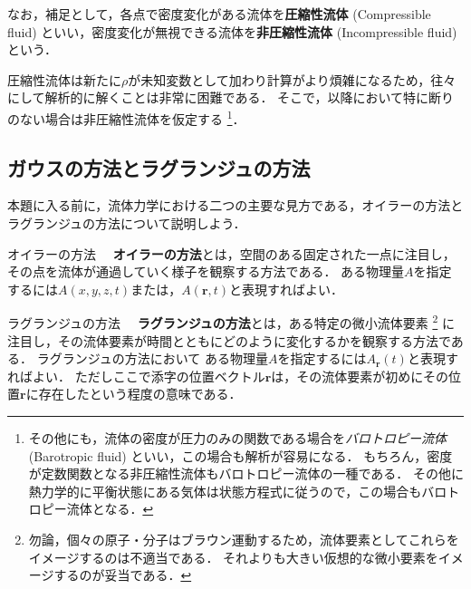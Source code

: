 \documentclass[uplatex,dvipdfmx,a4j,11pt]{jsreport}
\newcommand{\keyword}[1]{\textcolor{mainblue}{\textbf{#1}}}
\newcommand{\diff}{\mathrm{d}} %
\numberwithin{equation}{chapter}
\begin{document}
なお，補足として，各点で密度変化がある流体を\keyword{圧縮性流体} (Compressible fluid) といい，密度変化が無視できる流体を\keyword{非圧縮性流体} (Incompressible fluid) という．

圧縮性流体は新たに$\rho$が未知変数として加わり計算がより煩雑になるため，往々にして解析的に解くことは非常に困難である．
そこで，以降において特に断りのない場合は非圧縮性流体を仮定する
\footnote{
  その他にも，流体の密度が圧力のみの関数である場合を\emph{バロトロピー流体} (Barotropic fluid) といい，この場合も解析が容易になる．
  もちろん，密度が定数関数となる非圧縮性流体もバロトロピー流体の一種である．
  その他に熱力学的に平衡状態にある気体は状態方程式に従うので，この場合もバロトロピー流体となる．
}．




\subsection{ガウスの方法とラグランジュの方法}
本題に入る前に，流体力学における二つの主要な見方である，オイラーの方法とラグランジュの方法について説明しよう．

\begin{definition}{オイラーの方法}{}{}
  　\keyword{オイラーの方法}とは，空間のある固定された一点に注目し，その点を流体が通過していく様子を観察する方法である．
  ある物理量$A$を指定するには$A(x,y,z,t)$または，$A(\mathbf{r},t)$と表現すればよい．
\end{definition}

\begin{definition}{ラグランジュの方法}{}{}
  　\keyword{ラグランジュの方法}とは，ある特定の微小流体要素
  \footnote{
  勿論，個々の原子・分子はブラウン運動するため，流体要素としてこれらをイメージするのは不適当である．
  それよりも大きい仮想的な微小要素をイメージするのが妥当である．
  }
  に注目し，その流体要素が時間とともにどのように変化するかを観察する方法である．
  ラグランジュの方法において
  ある物理量$A$を指定するには$A_{\mathbf{r}}(t)$と表現すればよい．
  ただしここで添字の位置ベクトル$\mathbf{r}$は，その流体要素が初めにその位置$\mathbf{r}$に存在したという程度の意味である．
\end{definition}
\end{document}
